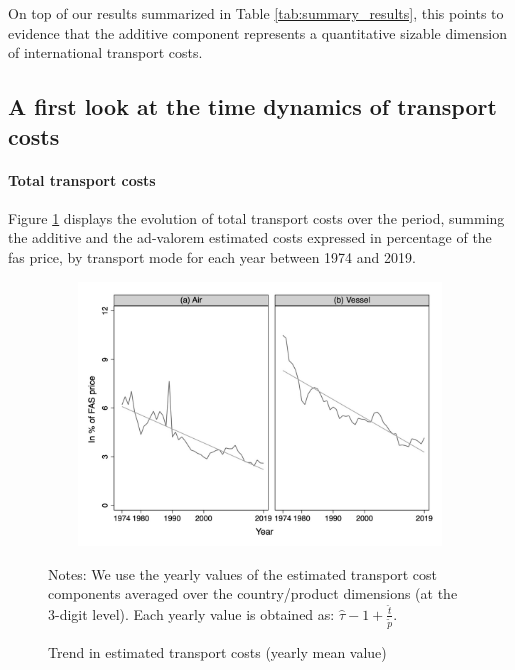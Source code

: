 \documentclass[a4paper,11pt]{article}
\begin{document}
On top of our results summarized in Table \ref{tab:summary_results}, this points to evidence that the additive component represents a quantitative sizable dimension of international transport costs.\smallskip


\subsection{A first look at the time dynamics of transport costs}


\paragraph{Total transport costs} Figure \ref{fig:Trends_in_TC} displays the evolution of total transport costs over the period, summing the additive and the ad-valorem estimated costs expressed in percentage of the fas price, by transport mode for each year between 1974 and 2019.

\begin{figure}[htbp]
\caption{Trend in estimated transport costs (yearly mean value)}
\label{fig:Trends_in_TC}
\begin{center}
\includegraphics[width=14cm, height=7cm]{Figure2_Trend_of_totalTC_bymode.jpg}

\begin{minipage} [c]  {5in} \scriptsize%
Notes: We use the yearly values of the estimated transport cost components averaged over the country/product dimensions (at the 3-digit level). Each yearly value is obtained as: $\widehat{\tau}-1+\frac{\widehat{t}}{\widetilde{p}}$.
\end{minipage}
\end{center}
\end{figure}

\end{document}
